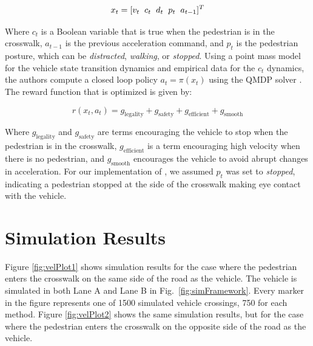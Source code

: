 \documentclass[letterpaper, 10 pt, conference]{ieeeconf} %
\begin{document}
\begin{equation}
x_t = [v_t \hspace{2mm} c_t \hspace{2mm} d_t \hspace{2mm} p_t \hspace{2mm} a_{t-1}]^T
\end{equation}

Where $c_t$ is a Boolean variable that is true when the pedestrian is in the crosswalk, $a_{t-1}$ is the previous acceleration command, and $p_t$ is the pedestrian posture, which can be \textit{distracted}, \textit{walking}, or \textit{stopped}. Using a point mass model for the vehicle state transition dynamics and empirical data for the $c_t$ dynamics, the authors compute a closed loop policy $a_t = \pi(x_t)$ using the QMDP solver \cite{Kochenderfer2015}. The reward function that is optimized is given by: 

\begin{equation}
r(x_t, a_t) = g_\mathrm{legality} + g_\mathrm{safety} + g_\mathrm{efficient} + g_\mathrm{smooth}
\end{equation}

Where $g_\mathrm{legality}$ and $g_\mathrm{safety}$ are terms encouraging the vehicle to stop when the pedestrian is in the crosswalk, $g_\mathrm{efficient}$ is a term encouraging high velocity when there is no pedestrian, and $g_\mathrm{smooth}$ encourages the vehicle to avoid abrupt changes in acceleration. For our implementation of \cite{Thornton2018}, we assumed $p_t$ was set to \textit{stopped}, indicating a pedestrian stopped at the side of the crosswalk making eye contact with the vehicle.  

\section{Simulation Results}

Figure \ref{fig:velPlot1} shows simulation results for the case where the pedestrian enters the crosswalk on the same side of the road as the vehicle. The vehicle is simulated in both Lane A and Lane B in Fig.~\ref{fig:simFramework}. Every marker in the figure represents one of 1500 simulated vehicle crossings, 750 for each method. Figure \ref{fig:velPlot2} shows the same simulation results, but for the case where the pedestrian enters the crosswalk on the opposite side of the road as the vehicle.
\end{document}
